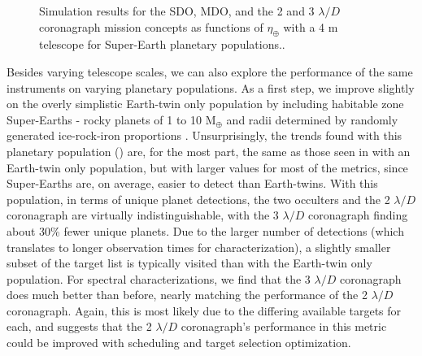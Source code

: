 \begin{figure}[ht]
\begin{center}
\begin{tabular}{c c}
  \end{tabular}
 \end{center}
 \caption[4 m telescope comparison for super-Earths]{ \label{fig:compinsts4mSE} Simulation results for the SDO, MDO, and the 2 and 3 $\lambda/D$ coronagraph mission concepts as functions of $\eta_\oplus$ with a 4 m telescope for Super-Earth planetary populations..}
 \end{figure}

Besides varying telescope scales, we can also explore the performance of the same instruments on varying planetary populations.  As a first step, we improve slightly on the overly simplistic Earth-twin only population by including habitable zone Super-Earths - rocky planets of 1 to 10 M$_\oplus$ and radii determined by randomly generated ice-rock-iron proportions \citep{fortney2007}. Unsurprisingly, the trends found with this planetary population () are, for the most part, the same as those seen in  with an Earth-twin only population, but with larger values for most of the metrics, since Super-Earths are, on average, easier to detect than Earth-twins.  With this population, in terms of unique planet detections, the two occulters and the 2 $\lambda/D$ coronagraph are virtually indistinguishable, with the 3 $\lambda/D$ coronagraph finding about 30\% fewer unique planets.  Due to the larger number of detections (which translates to longer observation times for characterization), a slightly smaller subset of the target list is typically visited than with the Earth-twin only population.  For spectral characterizations, we find that the 3 $\lambda/D$ coronagraph does much better than before, nearly matching the performance of the 2 $\lambda/D$ coronagraph.  Again, this is most likely due to the differing available targets for each, and suggests that the 2 $\lambda/D$ coronagraph's performance in this metric could be improved with scheduling and target selection optimization.

